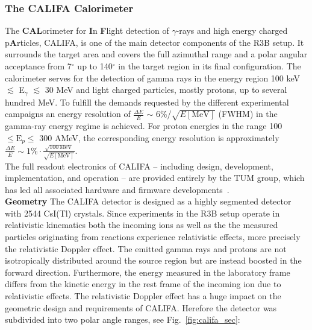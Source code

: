 \subsubsection{The CALIFA Calorimeter}\label{sec:califa}
The \textbf{CAL}orimeter for \textbf{I}n \textbf{F}light detection of $\gamma$-rays and high energy charged p\textbf{A}rticles, CALIFA, is one of the main detector components of the R3B setup. It surrounds the target area and covers the full azimuthal range and a polar angular acceptance from 7$^{\circ}$ up to 140$^{\circ}$ in the target region in its final configuration. The calorimeter serves for the detection of gamma rays in the energy region 100 keV $\lesssim$ E$_{\gamma}$ $\lesssim$ 30 MeV and light charged particles, mostly protons, up to several hundred MeV. To fulfill the demands requested by the different experimental campaigns an energy resolution of $\frac{\Delta E}{E}$ $\sim$ 6\%/$\sqrt{E[\text{MeV}]}$ (FWHM) in the gamma-ray energy regime is achieved. For proton energies in the range 100 $\leq \text{E}_p \leq$ 300 AMeV, the corresponding energy resolution is approximately $\frac{\Delta E}{E}\sim 1\% \cdot\frac{\sqrt{100\,\text{MeV}}}{\sqrt{E[\text{MeV}]}}$.\\
The full readout electronics of CALIFA -- including design, development, implementation, and operation -- are provided entirely by the TUM group, which has led all associated hardware and firmware developments~\cite{bendel2014entwicklung, Bendel:98055, winkel2011implementierung, winkel2016komplexe, pklenze}. \\[1em]
\textbf{Geometry}\newline
The CALIFA detector is designed as a highly segmented detector with 2544 CsI(Tl) crystals. Since experiments in the R3B setup operate in relativistic kinematics both the incoming ions as well as the the measured particles originating from reactions experience relativistic effects, more precisely the relativistic Doppler effect. The emitted gamma rays and protons are not isotropically distributed around the source region but are instead boosted in the forward direction. Furthermore, the energy measured in the laboratory frame differs from the kinetic energy in the rest frame of the incoming ion due to relativistic effects.\newline
The relativistic Doppler effect has a huge impact on the geometric design and requirements of CALIFA. Herefore the detector was subdivided into two polar angle ranges, see Fig.~\ref{fig:califa_sec}:
